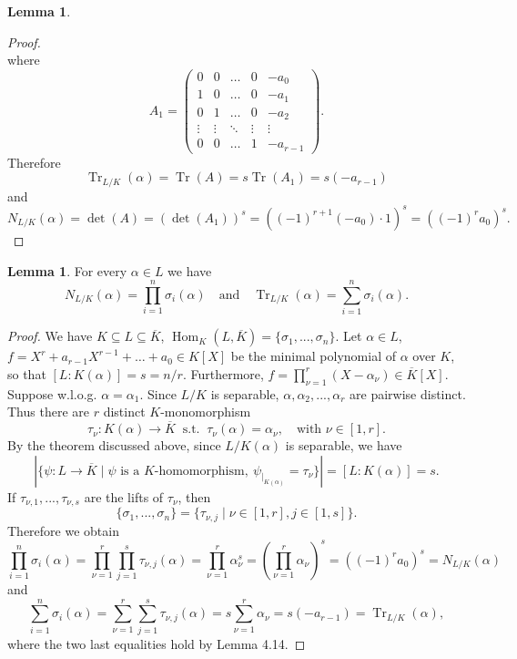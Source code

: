 \documentclass[12pt,a4paper]{report}
\theoremstyle{definition}
\newtheorem{lemma}[theorem]{Lemma}
\theoremstyle{num.custom-title}
\DeclareMathOperator{\Hom}{Hom}
\DeclareMathOperator{\sse}{\subseteq}
\DeclareMathOperator{\Tr}{Tr}
\newcommand{\ol}{\overline}
\begin{document}
\begin{lemma}
\begin{proof}
\[\]
where
\[
A_1 =
\begin{pmatrix}
0 & 0 & \ldots & 0 & -a_0 \\
1 & 0 & \ldots & 0 & -a_1 \\
0 & 1 & \ldots & 0 & -a_2 \\
\vdots & \vdots & \ddots & \vdots & \vdots \\
0 & 0 & \ldots & 1 & -a_{r-1}
\end{pmatrix}.
\]
Therefore
\[
\Tr_{L/K}(\alpha) = \Tr(A) = s\Tr(A_1) = s(-a_{r-1})
\]
and
\[
N_{L/K}(\alpha) = \det(A) = (\det(A_1))^s = ((-1)^{r+1} (-a_0) \cdot 1)^s = ((-1)^r a_0)^s.
\]
\end{proof}
\end{lemma}

\begin{lemma}
For every $\alpha \in L$ we have 
\[
N_{L/K}(\alpha) = \prod_{i=1}^n \sigma_i(\alpha) \quad \text{and} \quad \Tr_{L/K}(\alpha) = \sum_{i=1}^n \sigma_i(\alpha).
\]
\begin{proof}
We have $K \sse L \sse \ol{K}$, $\Hom_K(L,\ol{K}) = \{\sigma_1,...,\sigma_n\}$. Let $\alpha \in L$, $f = X^r + a_{r-1} X^{r-1} + \ldots + a_0 \in K[X]$ be the minimal polynomial of $\alpha$ over $K$, so that $[L:K(\alpha)] = s = n/r$. Furthermore, $f = \prod_{\nu=1}^r (X-\alpha_\nu) \in \ol{K}[X]$.\\
Suppose w.l.o.g. $\alpha=\alpha_1$. Since $L/K$ is separable, $\alpha, \alpha_2,...,\alpha_r$ are pairwise distinct. Thus there are $r$ distinct 	$K$-monomorphism
\[
\tau_\nu : K(\alpha) \to \ol{K} \ \text{ s.t. } \ \tau_\nu(\alpha)=\alpha_\nu, \quad \text{with } \nu \in [1,r].
\]
By the theorem discussed above, since $L/K(\alpha)$ is separable, we have
\[
|\{ \psi : L \to \ol{K} \mid \psi \text{ is a } K\text{-homomorphism}, \ \psi_{|_{K(\alpha)}} = \tau_\nu \}| = [L:K(\alpha)] = s.
\]
If $\tau_{\nu,1},...,\tau_{\nu,s}$ are the lifts of $\tau_\nu$, then
\[
\{\sigma_1,...,\sigma_n\} = \{ \tau_{\nu,j} \mid \nu \in [1,r], j \in [1,s] \}.
\]
Therefore we obtain
\[
\prod_{i=1}^n \sigma_i(\alpha) = \prod_{\nu=1}^r \prod_{j=1}^s \tau_{\nu,j}(\alpha) = \prod_{\nu=1}^r \alpha_\nu^s = \left( \prod_{\nu=1}^r \alpha_{\nu} \right)^s = ((-1)^r a_0)^s = N_{L/K}(\alpha)
\]
and
\[
\sum_{i=1}^n \sigma_i(\alpha) = \sum_{\nu=1}^r \sum_{j=1}^s \tau_{\nu,j}(\alpha) = s \sum_{\nu=1}^r \alpha_\nu = s(-a_{r-1}) = \Tr_{L/K}(\alpha),
\]
where the two last equalities hold by Lemma 4.14.
\end{proof}
\end{lemma}
\end{document}
